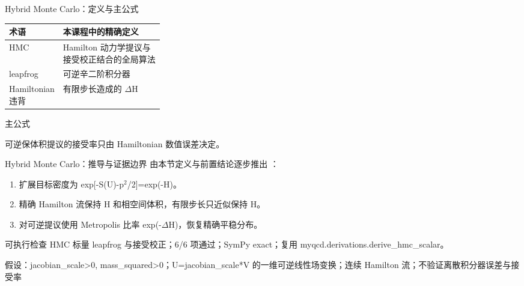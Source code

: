 \begin{frame}[t]{Hybrid Monte Carlo：定义与主公式}
\footnotesize\begin{tabularx}{\linewidth}{p{0.30\linewidth}Y}
\toprule 术语 & 本课程中的精确定义\\\midrule
{} HMC & Hamilton 动力学提议与接受校正结合的全局算法\\
 leapfrog & 可逆辛二阶积分器\\
 Hamiltonian 违背 & 有限步长造成的 \ensuremath{\Delta}H\\
\bottomrule\end{tabularx}\vspace{0.15cm}
\begin{block}{ 主公式}\centering{}\end{block}
可逆保体积提议的接受率只由 Hamiltonian 数值误差决定。
\end{frame}

\begin{frame}[t]{Hybrid Monte Carlo：推导与证据边界}
\footnotesize
{}\quad 由本节定义与前置结论逐步推出 ：
\begin{enumerate}
\item 扩展目标密度为 exp[-S(U)-p\ensuremath{^{2}}/\allowbreak{}2]=exp(-H)。
\item 精确 Hamilton 流保持 H 和相空间体积，有限步长只近似保持 H。
\item 对可逆提议使用 Metropolis 比率 exp(-\ensuremath{\Delta}H)，恢复精确平稳分布。
\end{enumerate}\begin{block}{可执行检查}
\quad HMC 标量 leapfrog 与接受校正；6/6 项通过；SymPy exact；复用 myqcd.derivations.derive\_hmc\_scalar。
\par\scriptsize 假设：jacobian\_scale>0, mass\_squared>0；U=jacobian\_scale*V 的一维可逆线性场变换；连续 Hamilton 流；不验证离散积分器误差与接受率
\end{block}
\end{frame}


